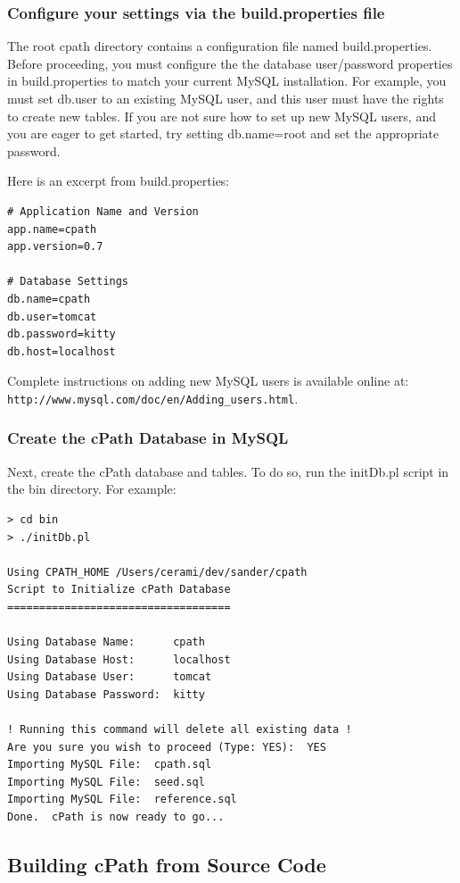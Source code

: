 \documentclass[letterpaper,12pt]{article}
\begin{document}
\subsubsection{Configure your settings via the build.properties file}

The root cpath directory contains a configuration file named build.properties.  Before proceeding, you must configure the the database user/password properties in build.properties to match your current MySQL installation.  For example, you must set db.user to an existing MySQL user, and this user must have the rights to create new tables.  If you are not sure how to set up new MySQL users, and you are eager to get started, try setting db.name=root and set the appropriate password.  
 
Here is an excerpt from build.properties:

\begin{verbatim}
# Application Name and Version
app.name=cpath
app.version=0.7

# Database Settings
db.name=cpath
db.user=tomcat
db.password=kitty
db.host=localhost 
\end{verbatim}

Complete instructions on adding new MySQL users is available online at:
\verb+http://www.mysql.com/doc/en/Adding_users.html+.

\subsubsection{Create the cPath Database in MySQL}

Next, create the cPath database and tables.  To do so, run the initDb.pl script in the bin directory. For example:

\begin{verbatim}
> cd bin
> ./initDb.pl

Using CPATH_HOME /Users/cerami/dev/sander/cpath
Script to Initialize cPath Database
===================================

Using Database Name:      cpath
Using Database Host:      localhost
Using Database User:      tomcat
Using Database Password:  kitty

! Running this command will delete all existing data !
Are you sure you wish to proceed (Type: YES):  YES
Importing MySQL File:  cpath.sql
Importing MySQL File:  seed.sql
Importing MySQL File:  reference.sql
Done.  cPath is now ready to go...
\end{verbatim}

\subsection{Building cPath from Source Code}
\end{document}
